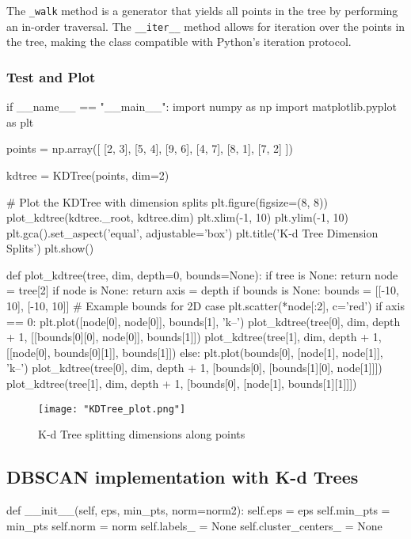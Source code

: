 \documentclass{article}
\begin{document}
	The \texttt{\_walk} method is a generator that yields all points in the tree by performing an in-order traversal. The \texttt{\_\_iter\_\_} method allows for iteration over the points in the tree, making the class compatible with Python's iteration protocol.
	
	\subsubsection{Test and Plot}
	\begin{python}
if __name__ == "__main__":
	import numpy as np
	import matplotlib.pyplot as plt
	
	points = np.array([
		[2, 3],
		[5, 4],
		[9, 6],
		[4, 7],
		[8, 1],
		[7, 2]
	])
	
	kdtree = KDTree(points, dim=2)
	
	# Plot the KDTree with dimension splits
	plt.figure(figsize=(8, 8))
	plot_kdtree(kdtree._root, kdtree.dim)
	plt.xlim(-1, 10)
	plt.ylim(-1, 10)
	plt.gca().set_aspect('equal', adjustable='box')
	plt.title('K-d Tree Dimension Splits')
	plt.show()
	\end{python}

	\begin{python}
def plot_kdtree(tree, dim, depth=0, bounds=None):
	if tree is None:
		return	
	node = tree[2]
	if node is None:
		return
	axis = depth %
	if bounds is None:
		bounds = [[-10, 10], [-10, 10]]  # Example bounds for 2D case
	plt.scatter(*node[:2], c='red')
	if axis == 0:
		plt.plot([node[0], node[0]], bounds[1], 'k--')
		plot_kdtree(tree[0], dim, depth + 1, [[bounds[0][0], node[0]], bounds[1]])
		plot_kdtree(tree[1], dim, depth + 1, [[node[0], bounds[0][1]], bounds[1]])
	else:
		plt.plot(bounds[0], [node[1], node[1]], 'k--')
		plot_kdtree(tree[0], dim, depth + 1, [bounds[0], [bounds[1][0], node[1]]])
		plot_kdtree(tree[1], dim, depth + 1, [bounds[0], [node[1], bounds[1][1]]])		
	\end{python}

	\begin{figure}[H]
		\centering
		\texttt{[image: "KDTree\_plot.png"]}
		\caption{K-d Tree splitting dimensions along points}
	\end{figure}
	
	\subsection{DBSCAN implementation with K-d Trees}
	
	\begin{python}
def __init__(self, eps, min_pts, norm=norm2):
	self.eps = eps
	self.min_pts = min_pts
	self.norm = norm
	self.labels_ = None
	self.cluster_centers_ = None\end{python}
	
\end{document}
